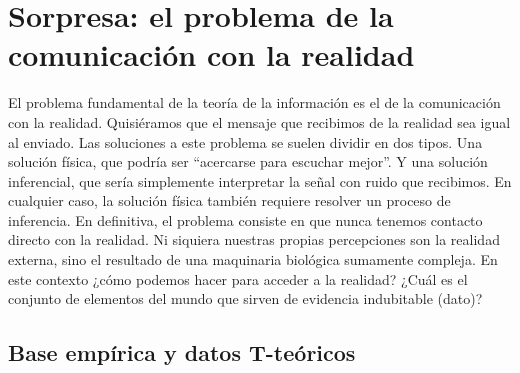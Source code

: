 \documentclass[a4paper,11pt]{book}
\theoremstyle{definition}
\begin{document}
%

\section{Sorpresa: el problema de la comunicación con la realidad}

El problema fundamental de la teoría de la información es el de la comunicación con la realidad.
%
Quisiéramos que el mensaje que recibimos de la realidad sea igual al enviado.
%
Las soluciones a este problema se suelen dividir en dos tipos.
%
Una solución física, que podría ser ``acercarse para escuchar mejor''.
%
Y una solución inferencial, que sería simplemente interpretar la señal con ruido que recibimos.
%
En cualquier caso, la solución física también requiere resolver un proceso de inferencia.
%
En definitiva, el problema consiste en que nunca tenemos contacto directo con la realidad.
%
Ni siquiera nuestras propias percepciones son la realidad externa, sino el resultado de una maquinaria biológica sumamente compleja.
%
En este contexto ¿cómo podemos hacer para acceder a la realidad?
%
¿Cuál es el conjunto de elementos del mundo que sirven de evidencia indubitable (dato)?

\subsection{Base empírica y datos T-teóricos}
\end{document}
